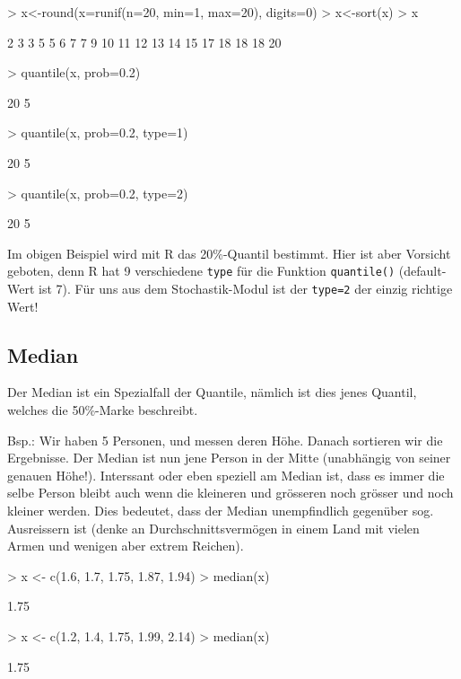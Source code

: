 \begin{Schunk}
\begin{Sinput}
> x<-round(x=runif(n=20, min=1, max=20), digits=0)
> x<-sort(x)
> x
\end{Sinput}
\begin{Soutput}
 [1]  2  3  3  5  5  6  7  7  9 10 11 12 13 14 15 17 18 18 18 20
\end{Soutput}
\begin{Sinput}
> quantile(x, prob=0.2)
\end{Sinput}
\begin{Soutput}
20%
  5 
\end{Soutput}
\begin{Sinput}
> quantile(x, prob=0.2, type=1)
\end{Sinput}
\begin{Soutput}
20%
  5 
\end{Soutput}
\begin{Sinput}
> quantile(x, prob=0.2, type=2)
\end{Sinput}
\begin{Soutput}
20%
  5 
\end{Soutput}
\end{Schunk}
Im obigen Beispiel wird mit R das 20\%-Quantil bestimmt. Hier ist aber 
Vorsicht geboten, denn R hat 9 verschiedene \verb!type! für die Funktion
\verb!quantile()! (default-Wert ist 7). Für uns aus dem 
Stochastik-Modul ist der \verb!type=2! 
der einzig richtige Wert!

\subsection{Median}
Der Median ist ein Spezialfall der Quantile, nämlich ist dies jenes Quantil,
welches die 50\%-Marke beschreibt.

Bsp.: Wir haben 5 Personen, und messen deren Höhe. Danach sortieren wir die
Ergebnisse. Der Median ist nun jene Person in der Mitte (unabhängig von seiner
genauen Höhe!). Interssant oder eben speziell am Median ist,
dass es immer die selbe Person bleibt auch wenn die kleineren und grösseren
noch grösser und noch kleiner werden. Dies bedeutet, dass der Median 
unempfindlich gegenüber sog. Ausreissern ist (denke an Durchschnittsvermögen
in einem Land mit vielen Armen und wenigen aber extrem Reichen).
\begin{Schunk}
\begin{Sinput}
> x <- c(1.6, 1.7, 1.75, 1.87, 1.94)
> median(x)
\end{Sinput}
\begin{Soutput}
[1] 1.75
\end{Soutput}
\begin{Sinput}
> x <- c(1.2, 1.4, 1.75, 1.99, 2.14)
> median(x)
\end{Sinput}
\begin{Soutput}
[1] 1.75
\end{Soutput}
\end{Schunk}

